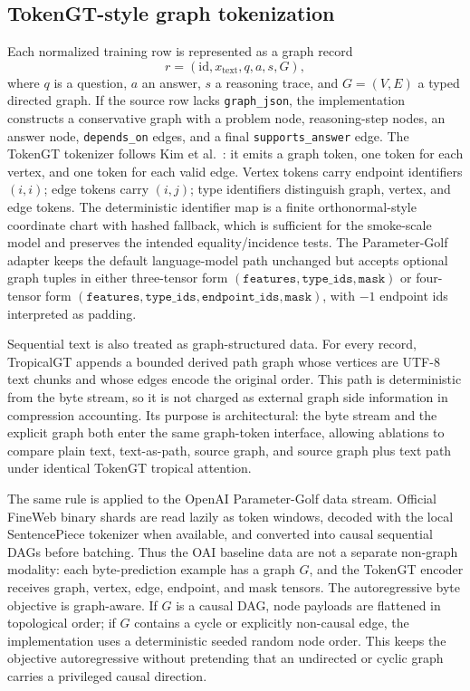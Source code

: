 \documentclass[11pt]{article}
\begin{document}
\subsection{TokenGT-style graph tokenization}
Each normalized training row is represented as a graph record
\[
  r=(\mathrm{id},x_{\mathrm{text}},q,a,s,G),
\]
where \(q\) is a question, \(a\) an answer, \(s\) a reasoning trace, and \(G=(V,E)\) a typed directed graph.  If the source row lacks \texttt{graph\_json}, the implementation constructs a conservative graph with a problem node, reasoning-step nodes, an answer node, \texttt{depends\_on} edges, and a final \texttt{supports\_answer} edge.  The TokenGT tokenizer follows Kim et al.\ \cite{kim2022tokengt}: it emits a graph token, one token for each vertex, and one token for each valid edge.  Vertex tokens carry endpoint identifiers \((i,i)\); edge tokens carry \((i,j)\); type identifiers distinguish graph, vertex, and edge tokens.  The deterministic identifier map is a finite orthonormal-style coordinate chart with hashed fallback, which is sufficient for the smoke-scale model and preserves the intended equality/incidence tests.  The Parameter-Golf adapter keeps the default language-model path unchanged but accepts optional graph tuples in either three-tensor form \((\texttt{features},\texttt{type\_ids},\texttt{mask})\) or four-tensor form \((\texttt{features},\texttt{type\_ids},\texttt{endpoint\_ids},\texttt{mask})\), with \(-1\) endpoint ids interpreted as padding.

Sequential text is also treated as graph-structured data.  For every record, TropicalGT appends a bounded derived path graph whose vertices are UTF-8 text chunks and whose edges encode the original order.  This path is deterministic from the byte stream, so it is not charged as external graph side information in compression accounting.  Its purpose is architectural: the byte stream and the explicit graph both enter the same graph-token interface, allowing ablations to compare plain text, text-as-path, source graph, and source graph plus text path under identical TokenGT tropical attention.

The same rule is applied to the OpenAI Parameter-Golf data stream.  Official FineWeb binary shards are read lazily as token windows, decoded with the local SentencePiece tokenizer when available, and converted into causal sequential DAGs before batching.  Thus the OAI baseline data are not a separate non-graph modality: each byte-prediction example has a graph \(G\), and the TokenGT encoder receives graph, vertex, edge, endpoint, and mask tensors.  The autoregressive byte objective is graph-aware.  If \(G\) is a causal DAG, node payloads are flattened in topological order; if \(G\) contains a cycle or explicitly non-causal edge, the implementation uses a deterministic seeded random node order.  This keeps the objective autoregressive without pretending that an undirected or cyclic graph carries a privileged causal direction.
\end{document}
